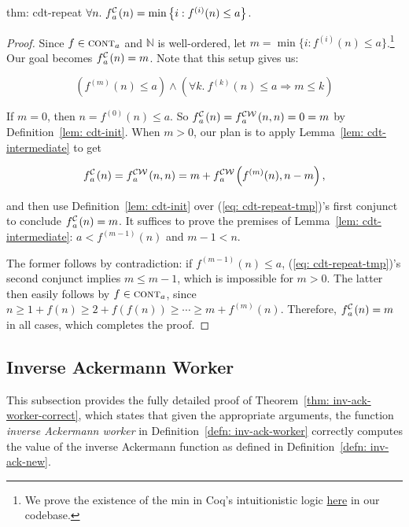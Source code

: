 \begin{usethmcounterof}{thm: cdt-repeat}
	$	\forall n.~ \cdt{f}{a}(n) = \min\left\{ i : f^{(i)}(n) \le a \right\} $.
\end{usethmcounterof}

\begin{proof}
	Since $f\in \text{\scshape{cont}}_{a}$ and $\mathbb{N}$ is well-ordered,
	let $m = \min\big\{i : f^{(i)}(n)\le a\big\}$.\footnote{We prove the existence
		of the min in Coq’s intuitionistic logic \href{https://github.com/inv-ack/inv-ack/blob/6099297c6ab0e16d14b037fb5ed600c4d22818f6/countdown.v\#L125-L150}{here} in our codebase.} Our goal becomes
	$\cdt{f}{a}(n) = m$. Note that this setup gives us:
	
	\begin{equation} \label{eq: cdt-repeat-tmp}
	\left(f^{(m)}(n) \le a\right) \wedge
	\left(\forall k.~f^{(k)}(n)\le a \Rightarrow m \le k\right)
	\end{equation}
	
	If $m = 0$, then $n = f^{(0)}(n)\le a$. So $\cdt{f}{a}(n) = \cdw{f}{a}(n, n) = 0 = m$ by Definition~\ref{lem: cdt-init}.
	When $m > 0$, our plan is to apply Lemma~\ref{lem: cdt-intermediate} to get
	
	\begin{equation*}
	\cdt{f}{a}(n) = \cdw{f}{a}(n, n) = m + \cdw{f}{a}\left(f^{(m)}(n), n-m\right),
	\end{equation*}
	
	and then use Definition~\ref{lem: cdt-init} over (\ref{eq: cdt-repeat-tmp})'s first conjunct to conclude $\cdt{f}{a}(n) = m$. It suffices to prove the premises of Lemma~\ref{lem: cdt-intermediate}: $a < f^{(m-1)}(n)$ and $m-1 < n$.
	
	The former follows by contradiction: if $f^{(m-1)}(n) \le a$, (\ref{eq: cdt-repeat-tmp})'s second conjunct implies $m\le m-1$, which is impossible for $m > 0$. The latter then easily follows by $f\in \text{\scshape{cont}}_{a}$, since
	$n \ge 1 + f(n) \ge 2 + f(f(n)) \ge \cdots \ge m + f^{(m)}(n)$.
	\linebreak Therefore, $\cdt{f}{a}(n) = m$ in all cases, which completes the proof.
\end{proof}

\subsection{Inverse Ackermann Worker}
\label{apx:proof_correct_inv_ack_worker}
This subsection provides the fully detailed proof of Theorem~\ref{thm: inv-ack-worker-correct}, which states that given the appropriate arguments, the function \emph{inverse Ackermann worker} in Definition~\ref{defn: inv-ack-worker} correctly computes the value of the inverse Ackermann function as defined in Definition~\ref{defn: inv-ack-new}.

